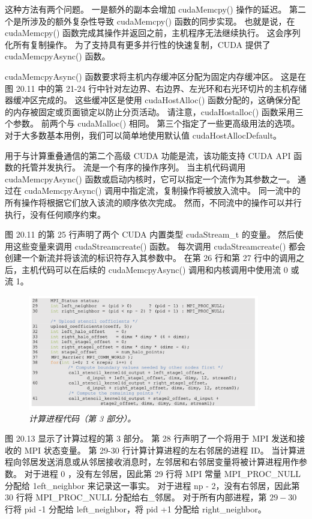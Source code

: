 这种方法有两个问题。 一是额外的副本会增加 cudaMemcpy() 操作的延迟。 
第二个是所涉及的额外复杂性导致 cudaMemcpy() 函数的同步实现。 
也就是说，在 cudaMemcpy() 函数完成其操作并返回之前，主机程序无法继续执行。 
这会序列化所有复制操作。 为了支持具有更多并行性的快速复制，CUDA 提供了 cudaMemcpyAsync() 函数。

cudaMemcpyAsync() 函数要求将主机内存缓冲区分配为固定内存缓冲区。 
这是在图 20.11 中的第 21-24 行中针对左边界、右边界、左光环和右光环切片的主机存储器缓冲区完成的。 
这些缓冲区是使用 cudaHostAlloc() 函数分配的，这确保分配的内存被固定或页面锁定以防止分页活动。 
请注意，cudaHostalloc() 函数采用三个参数。 前两个与 cudaMalloc() 相同。 
第三个指定了一些更高级用法的选项。 对于大多数基本用例，我们可以简单地使用默认值 cudaHostAllocDefault。

用于与计算重叠通信的第二个高级 CUDA 功能是流，该功能支持 CUDA API 函数的托管并发执行。 流是一个有序的操作序列。 
当主机代码调用 cudaMemcpyAsync() 函数或启动内核时，它可以指定一个流作为其参数之一。 
通过在 cudaMemcpyAsync() 调用中指定流，复制操作将被放入流中。 同一流中的所有操作将根据它们放入该流的顺序依次完成。 
然而，不同流中的操作可以并行执行，没有任何顺序约束。

图 20.11 的第 25 行声明了两个 CUDA 内置类型 cudaStream\_t 的变量。 
然后使用这些变量来调用 cudaStreamcreate() 函数。 
每次调用 cudaStreamcreate() 都会创建一个新流并将该流的标识符存入其参数中。 
在第 26 行和第 27 行中的调用之后，主机代码可以在后续的 cudaMemcpyAsync() 调用和内核调用中使用流 0 或流 1。

\begin{figure}[H]
	\centering
	\includegraphics[width=0.9\textwidth]{figs/F20.13.png}
	\caption{\textit{计算进程代码（第 3 部分）。}}
\end{figure}

图 20.13 显示了计算过程的第 3 部分。 第 28 行声明了一个将用于 MPI 发送和接收的 MPI 状态变量。 
第 29-30 行计算计算进程的左右邻居的进程 ID。 
当计算进程向邻居发送消息或从邻居接收消息时，左邻居和右邻居变量将被计算进程用作参数。 
对于进程 0 ，没有左邻居，因此第 29 行将 MPI 常量 MPI\_PROC\_NULL 分配给 1eft\_neighbor 来记录这一事实。 
对于进程 np - 2，没有右邻居，因此第 30 行将 MPI\_PROC\_NULL 分配给右\_邻居。 
对于所有内部进程，第 $29-30$ 行将 pid -1 分配给 left\_neighbor，将 pid +1 分配给 right\_neighbor。

